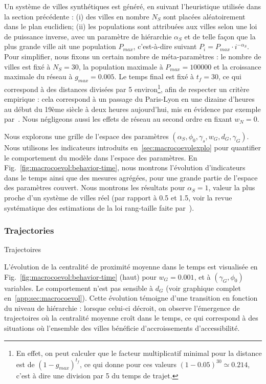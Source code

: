 Un système de villes synthétiques est généré, en suivant l'heuristique utilisée dans la section précédente : (i) des villes en nombre $N_S$ sont placées aléatoirement dans le plan euclidien; (ii) les populations sont attribuées aux villes selon une loi de puissance inverse, avec un paramètre de hiérarchie $\alpha_S$ et de telle façon que la plus grande ville ait une population $P_{max}$, c'est-à-dire suivant $P_i = P_{max} \cdot i^{-\alpha_S}$. Pour simplifier, nous fixons un certain nombre de méta-paramètres : le nombre de villes est fixé à $N_S = 30$, la population maximale à $P_{max} = 100000$ et la croissance maximale du réseau à $g_{max} = 0.005$. Le temps final est fixé à $t_f = 30$, ce qui correspond à des distances divisées par 5 environ\footnote{En effet, on peut calculer que le facteur multiplicatif minimal pour la distance est de $(1 - g_{max})^{t_f}$, ce qui donne pour ces valeurs $(1 - 0.05)^{30} \simeq 0.214$, c'est à dire une division par 5 du temps de trajet.}, afin de respecter un critère empirique : cela correspond à un passage du Paris-Lyon en une dizaine d'heures au début du 19ème siècle à deux heures aujourd'hui, mis en évidence par exemple par~\cite{thevenin2013mapping}. Nous négligeons aussi les effets de réseau au second ordre en fixant $w_N = 0$.




Nous explorons une grille de l'espace des paramètres $(\alpha_S,\phi_0,\gamma_s,w_G,d_G,\gamma_G)$. Nous utilisons les indicateurs introduits en~\ref{sec:macrocoevolexplo} pour quantifier le comportement du modèle dans l'espace des paramètres. En Fig.~\ref{fig:macrocoevol:behavior-time}, nous montrons l'évolution d'indicateurs dans le temps ainsi que des mesures agrégées, pour une grande partie de l'espace des paramètres couvert. Nous montrons les résultats pour $\alpha_S = 1$, valeur la plus proche d'un système de villes réel (par rapport à 0.5 et 1.5, voir la revue systématique des estimations de la loi rang-taille faite par~\cite{10.1371/journal.pone.0183919}).



\subsubsection{Trajectories}{Trajectoires}


L'évolution de la centralité de proximité moyenne dans le temps est visualisée en Fig.~\ref{fig:macrocoevol:behavior-time} (haut) pour $w_G = 0.001$, et à $(\gamma_G,\phi_0)$ variables. Le comportement n'est pas sensible à $d_G$ (voir graphique complet en~\ref{app:sec:macrocoevol}). Cette évolution témoigne d'une transition en fonction du niveau de hiérarchie : lorsque celui-ci décroit, on observe l'émergence de trajectoires où la centralité moyenne croît dans le temps, ce qui correspond à des situations où l'ensemble des villes bénéficie d'accroissements d'accessibilité.



